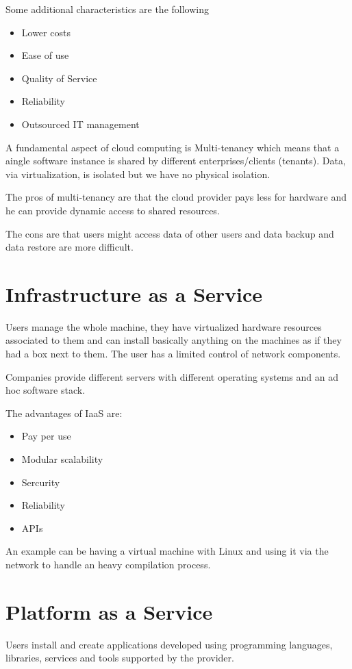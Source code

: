 Some additional characteristics are the following
\begin{itemize}
    \item Lower costs
    \item Ease of use
    \item Quality of Service
    \item Reliability
    \item Outsourced IT management
\end{itemize}
A fundamental aspect of cloud computing is Multi-tenancy which means that a aingle software instance is shared by different enterprises/clients (tenants). Data, via virtualization, is isolated but we have no physical isolation.

The pros of multi-tenancy are that the cloud provider pays less for hardware and he can provide dynamic access to shared resources.

The cons are that users might access data of other users and data backup and data restore are more difficult.

\section{Infrastructure as a Service}
Users manage the whole machine, they have virtualized hardware resources associated to them and can install basically anything on the machines as if they had a box next to them. The user has a limited control of network components.

Companies provide different servers with different operating systems and an ad hoc software stack.

The advantages of IaaS are:
\begin{itemize}
    \item Pay per use
    \item Modular scalability
    \item Sercurity
    \item Reliability
    \item APIs
\end{itemize}
An example can be having a virtual machine with Linux and using it via the network to handle an heavy compilation process.

\section{Platform as a Service}
Users install and create applications developed using programming languages, libraries, services and tools supported by the provider.


